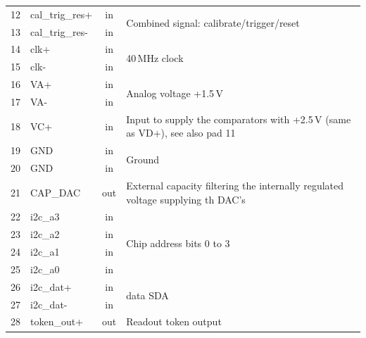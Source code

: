 \begin{table}[h]
\begin{center}
{\begin{tabular}{clcl}
	\midrule %
	12 & cal\_trig\_res+ & in  & \multirow{2}{*}{Combined signal: calibrate/trigger/reset} \\
	13 & cal\_trig\_res- & in  & \\
	\midrule %
	14 & clk+            & in  & \multirow{2}{*}{40\,MHz clock} \\
	15 & clk-            & in  & \\
	\midrule %
	16 & VA+             & in  &\multirow{2}{*}{Analog voltage +1.5\,V} \\
	17 & VA-             & in  & \\
	\midrule %
	18 & VC+             & in  & Input to supply the comparators with +2.5\,V (same as VD+), see also pad 11 \\
	\midrule %
	19 & GND             & in  & \multirow{2}{*}{Ground} \\
	20 & GND             & in  & \\
	\midrule %
	21 & CAP\_DAC        & out & External capacity filtering the internally regulated voltage supplying th DAC's \\
	\midrule %
	22 & i2c\_a3         & in  & \multirow{4}{*}{Chip address bits 0 to 3} \\
	23 & i2c\_a2         & in  & \\
	24 & i2c\_a1         & in  & \\
	25 & i2c\_a0         & in  & \\
	\midrule %
	26 & i2c\_dat+       & in  & \multirow{2}{*}{\isqc{} data SDA} \\
	27 & i2c\_dat-       & in  & \\
	\midrule %
	28 & token\_out+     & out & \multirow{2}{*}{Readout token output} \\

\end{tabular}}
\end{center}
\end{table}
